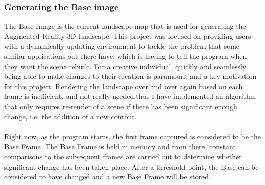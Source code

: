 \documentclass[11pt]{article}
\begin{document}
\subsubsection{Generating the Base image}
\label{sec:baseimage}
The Base Image is the current landscape map that is used for generating the
Augmented Reality 3D landscape. This project was focused on providing 
users with a dynamically updating environment to tackle the problem that
some similar applications out there have, which is having to tell the program
when they want the scene rebuilt. For a creative individual, quickly and seamlessly
being able to make changes to their creation is paramount and a key motivation
for this project. Rendering the landscape over and over again based on
each frame is inefficient, and not really needed,thus I have implemented an 
algorithm that only requires re-render of a scene if there has been significant
enough change, i.e. the addition of a new contour.\\
\\
Right now, as the program starts, the first frame captured is considered to 
be the Base Frame. The Base Frame is held in memory and from there, 
constant comparisons to the subsequent frames are carried
out to determine whether significant change has been taken place. After a
threshold point, the Base can be considered to have changed and a new Base 
Frame will be stored. 
\end{document}

